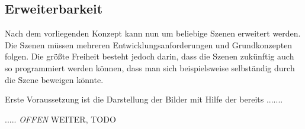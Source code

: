 \subsection{Erweiterbarkeit}
\label{subsec:unity-erweiterbarkeit}

Nach dem vorliegenden Konzept kann nun um beliebige Szenen erweitert werden. Die Szenen müssen mehreren Entwicklungsanforderungen und Grundkonzepten folgen. Die größte Freiheit besteht jedoch darin, dass die Szenen zukünftig auch so programmiert werden können, dass man sich beispielsweise selbständig durch die Szene beweigen könnte.

Erste Voraussetzung ist die Darstellung der Bilder mit Hilfe der bereits .......


..... \emph{OFFEN} WEITER, TODO

